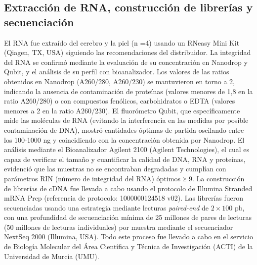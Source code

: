 \documentclass[10pt,a4paper]{article}
\begin{document}
\subsection{Extracción de RNA, construcción de librerías y secuenciación} 
El RNA fue extraído del cerebro y la piel (n =4) usando un RNeasy Mini Kit (Qiagen, TX, USA) siguiendo las recomendaciones del distribuidor. La integridad del RNA se confirmó mediante la evaluación de su concentración en Nanodrop y Qubit, y el análisis de su perfil con bioanalizador. Los valores de las ratios obtenidos en Nanodrop (A260/280, A260/230) se mantuvieron en torno a 2, indicando la ausencia de contaminación de proteínas (valores menores de 1,8 en la ratio A260/280) o con compuestos fenólicos, carbohidratos o EDTA (valores menores a 2 en la ratio A260/230). El fluorómetro Qubit, que específicamente mide las moléculas de RNA (evitando la interferencia en las medidas por posible contaminación de DNA), mostró cantidades óptimas de partida oscilando entre los 100-1000 ng y coincidiendo con la concentración obtenida por Nanodrop. El análisis mediante el Bioanalizador Agilent 2100 (Agilent Technologies), el cual es capaz de verificar el tamaño y cuantificar la calidad de DNA, RNA y proteínas, evidenció que las muestras no se encontraban degradadas y cumplían con parámetros RIN (número de integridad del RNA) óptimos ≥ 9. La construcción de librerías de cDNA fue llevada a cabo usando el protocolo de Illumina Stranded mRNA Prep (referencia de protocolo: 1000000124518 v02). Las librerías fueron secuenciadas usando una estrategia mediante lecturas \textit{paired-end} de $2 \times 100$ pb, con una profundidad de secuenciación mínima de 25 millones de pares de lecturas (50 millones de lecturas individuales) por muestra mediante el secuenciador NextSeq 2000 (Illumina, USA). Todo este proceso fue llevado a cabo en el servicio de Biología Molecular del Área Científica y Técnica de Investigación (ACTI) de la Universidad de Murcia (UMU).
\newpage
\end{document}
